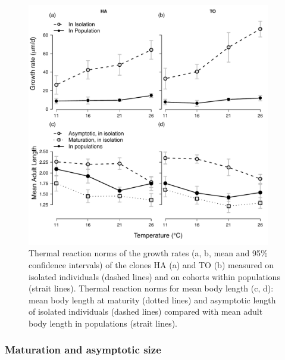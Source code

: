 \begin{figure}[!h] %
\centering
\includegraphics[width=0.95\textwidth]{5_ChapExp3/fig/Fig3} 
\caption[Thermal reaction norms of the growth
rates]{ Thermal reaction norms of the growth rates (a, b, mean and 95\% confidence intervals) of the clones HA (a) and TO (b) measured on isolated individuals (dashed lines)
and on cohorts within populations (strait lines). Thermal reaction norms for
mean body length (c, d): mean body length at maturity (dotted lines) and
asymptotic length of isolated individuals (dashed lines) compared with mean
adult body length in populations (strait lines).}
\label{Fig5-3}
\end{figure}

\subsubsection{Maturation and asymptotic size}

